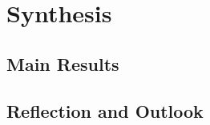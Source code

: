 \cleardoublepage
\chapter{Synthesis}
\label{ch:syn}

\section{Main Results}

\section{Reflection and Outlook}